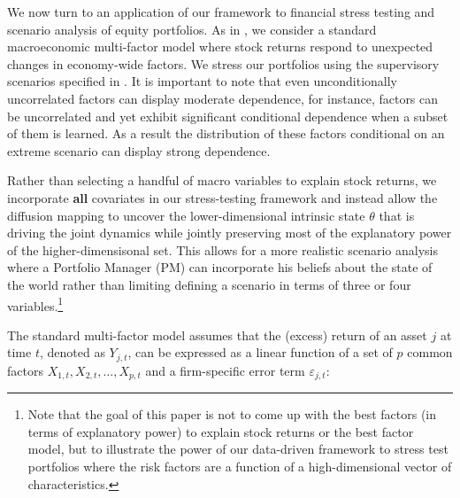 \documentclass[11pt]{article}
\theoremstyle{plain}
\theoremstyle{definition}
\theoremstyle{remark}
\numberwithin{equation}{section}
\newcommand{\veps}{\varepsilon}
\begin{document}
We now turn to an application of our framework to financial stress testing and scenario analysis of equity portfolios. As in \citet{chen1986economic}, we consider a standard macroeconomic multi-factor model where stock returns respond to unexpected changes in economy-wide factors. We stress our portfolios using the supervisory scenarios specified in \citet{federal_reserve_2022}. It is important to note that even unconditionally uncorrelated factors can display moderate dependence, for instance, factors can be uncorrelated and yet exhibit significant conditional dependence when a subset of them is learned. As a result the distribution of these factors conditional on an extreme scenario can display strong dependence.

Rather than selecting a handful of macro variables to explain stock returns, we incorporate \textbf{all} covariates in our stress-testing framework and instead allow the diffusion mapping to uncover the lower-dimensional intrinsic state $\theta$ that is driving the joint dynamics while jointly preserving most of the explanatory power of the higher-dimensisonal set. This allows for a more realistic scenario analysis where a Portfolio Manager (PM) can incorporate his beliefs about the state of the world rather than limiting defining a scenario in terms of three or four variables.\footnote{Note that the goal of this paper is not to come up with the best factors (in terms of explanatory power) to explain stock returns or the best factor model, but to illustrate the power of our data-driven framework to stress test portfolios where the risk factors are a function of a high-dimensional vector of characteristics.} 


The standard multi-factor model assumes that the (excess) return of an asset $j$ at time $t$, denoted as $Y_{j,t}$, can be expressed as a linear function of a set of $p$ common factors $X_{1,t}, X_{2,t}, \dots, X_{p,t}$ and a firm-specific error term $\veps_{j,t}$:
\end{document}
